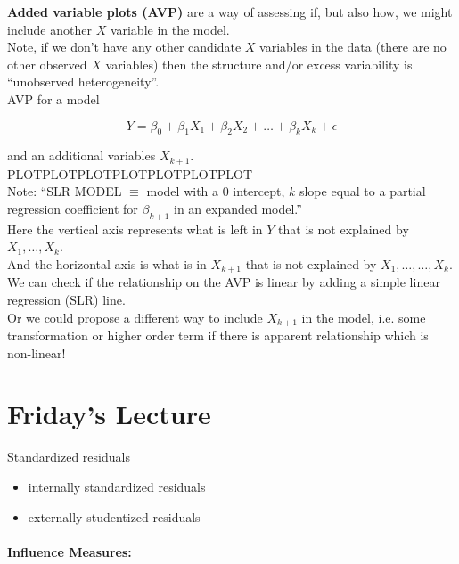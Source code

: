 \documentclass[a4paper, 11pt, twoside]{article}
\begin{document}
\textbf{Added variable plots (AVP)} are a way of assessing if, but also how, we might include another $X$ variable in the model.\\

Note, if we don't have any other candidate $X$ variables in the data (there are no other observed $X$ variables) then the structure and/or excess variability is ``unobserved heterogeneity''.\\

AVP for a model 

\[Y = \beta_0+\beta_1X_1+\beta_2X_2+\dots +\beta_kX_k+\epsilon\]

and an additional variables $X_{k+1}$.\\

PLOTPLOTPLOTPLOTPLOTPLOTPLOT\\

Note: ``SLR MODEL $\equiv$ model with a $0$ intercept, $k$ slope equal to a partial regression coefficient for $\beta_{k+1}$ in an expanded model.''\\

Here the vertical axis represents what is left in $Y$ that is not explained by $X_1, \dots, X_k$.\\

And the horizontal axis is what is in $X_{k+1}$ that is not explained by $X_1, \dots, \dots , X_k$.\\

We can check if the relationship on the AVP is linear by adding a simple linear regression (SLR) line.\\

Or we could propose a different way to include $X_{k+1}$ in the model, i.e. some transformation or higher order term if there is apparent relationship which is non-linear!

\section{Friday's Lecture}

Standardized residuals

\begin{itemize}
	\item internally standardized residuals
	\item externally studentized residuals
\end{itemize}

\paragraph{Influence Measures:}
\end{document}
